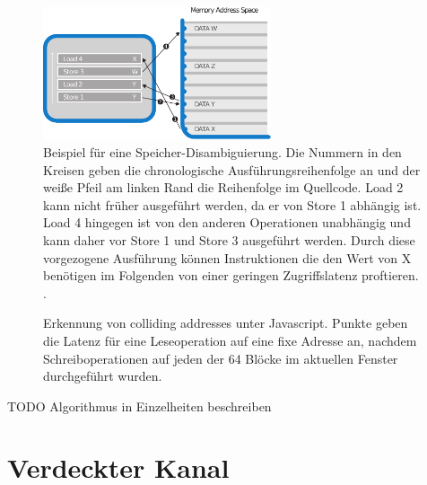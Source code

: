 \begin{figure}[h]
\label{fig:MemoryDisambiguation}
\centering
\includegraphics[width=0.6\textwidth]{methods/memory_disambiguation.pdf}
\caption{Beispiel für eine Speicher-Disambiguierung. Die Nummern in den Kreisen geben die chronologische Ausführungsreihenfolge an und der weiße Pfeil am linken Rand die Reihenfolge im Quellcode. Load 2 kann nicht früher ausgeführt werden, da er von Store 1 abhängig ist. Load 4 hingegen ist von den anderen Operationen unabhängig und kann daher vor Store 1 und Store 3 ausgeführt werden. Durch diese vorgezogene Ausführung können Instruktionen die den Wert von X benötigen im Folgenden von einer geringen Zugriffslatenz proftieren. \cite{CacheAssoWiki}.}
\end{figure}

\newtextend



\label{fig:colliding_addresses_js_measurement}
\begin{figure}[h]
\centering
\begin{scaletikzpicturetowidth}{\textwidth}

\end{scaletikzpicturetowidth}
\caption{Erkennung von colliding addresses unter Javascript. Punkte geben die Latenz für eine Leseoperation auf eine fixe Adresse an, nachdem Schreiboperationen auf jeden der 64 Blöcke im aktuellen Fenster durchgeführt wurden.}
\end{figure}


TODO Algorithmus in Einzelheiten beschreiben


\section{Verdeckter Kanal}

